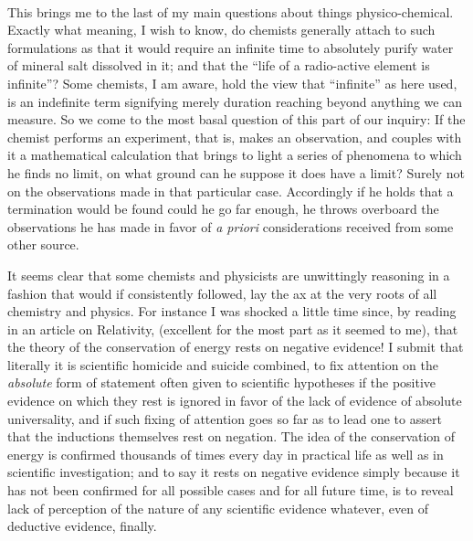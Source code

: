 \documentclass[a4paper, 11pt, oneside, polutonikogreek, english, landscape]{article}
\begin{document}
\paragraph{}
This brings me to the last of my main questions about things physico-chemical. Exactly what meaning, I wish to know, do chemists generally attach to such formulations as that it would require an infinite time to absolutely purify water of mineral salt dissolved in it; and that the ``life of a radio-active element is infinite''? Some chemists, I am aware, hold the view that ``infinite'' as here used, is an indefinite term signifying merely duration reaching beyond anything we can measure. So we come to the most basal question of this part of our inquiry: If the chemist performs an experiment, that is, makes an observation, and couples with it a mathematical calculation that brings to light a series of phenomena to which he finds no limit, on what ground can he suppose it does have a limit? Surely not on the observations made in that particular case. Accordingly if he holds that a termination would be found could he go far enough, he throws overboard the observations he has made in favor of \emph{a priori} considerations received from some other source.

It seems clear that some chemists and physicists are unwittingly reasoning in a fashion that would if consistently followed, lay the ax at the very roots of all chemistry and physics. For instance I was shocked a little time since, by reading in an article on Relativity, (excellent for the most part as it seemed to me), that the theory of the conservation of energy rests on negative evidence! I submit that literally it is scientific homicide and suicide combined, to fix attention on the \emph{absolute} form of statement often given to scientific hypotheses if the positive evidence on which they rest is ignored in favor of the lack of evidence of absolute universality, and if such fixing of attention goes so far as to lead one to assert that the inductions themselves rest on negation. The idea of the conservation of energy is confirmed thousands of times every day in practical life as well as in scientific investigation; and to say it rests on negative evidence simply because it has not been confirmed for all possible cases and for all future time, is to reveal lack of perception of the nature of any scientific evidence whatever, even of deductive evidence, finally.

\subsection{}
\end{document}
